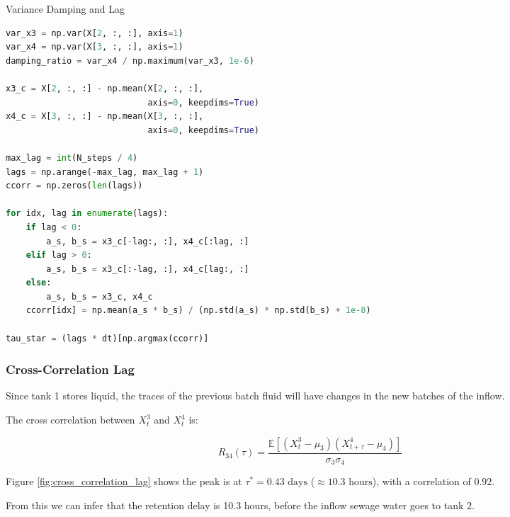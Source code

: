 \documentclass[conference]{IEEEtran}
\renewcommand{\smallskip}{\vspace{0.5\baselineskip}}
\theoremstyle{definitionsc}
\theoremstyle{plainsc}
\theoremstyle{remarksc}
\begin{document}
\begin{algorithm}[htbp]
\caption{Variance Damping and Lag}
\label{alg:variance_damping}
\begin{lstlisting}[language=Python]
var_x3 = np.var(X[2, :, :], axis=1)
var_x4 = np.var(X[3, :, :], axis=1)
damping_ratio = var_x4 / np.maximum(var_x3, 1e-6)

x3_c = X[2, :, :] - np.mean(X[2, :, :], 
                            axis=0, keepdims=True)
x4_c = X[3, :, :] - np.mean(X[3, :, :], 
                            axis=0, keepdims=True)

max_lag = int(N_steps / 4)
lags = np.arange(-max_lag, max_lag + 1)
ccorr = np.zeros(len(lags))

for idx, lag in enumerate(lags):
    if lag < 0:
        a_s, b_s = x3_c[-lag:, :], x4_c[:lag, :]
    elif lag > 0:
        a_s, b_s = x3_c[:-lag, :], x4_c[lag:, :]
    else:
        a_s, b_s = x3_c, x4_c
    ccorr[idx] = np.mean(a_s * b_s) / (np.std(a_s) * np.std(b_s) + 1e-8)

tau_star = (lags * dt)[np.argmax(ccorr)]

\end{lstlisting}
\end{algorithm}






\smallskip

\subsubsection*{\textbf{Cross-Correlation Lag}}

Since tank 1 stores liquid, the traces of the previous batch fluid will have changes in the new batches of the inflow.

\smallskip

The cross correlation between $X_t^3$ and $X_t^4$ is:



\begin{equation*}
	R_{34}(\tau)
=
\frac{
\mathbb{E}[
(X_t^3-\mu_3)(X_{t+\tau}^4-\mu_4)
]
}{
\sigma_3\sigma_4
}
\end{equation*}



Figure \ref{fig:cross_correlation_lag} shows the peak is at $\tau^* = 0.43\text{ days}$ ($\approx 10.3\text{ hours}$), with a correlation of $0.92$.

\smallskip

From this we can infer that the retention delay is 10.3 hours, before the inflow sewage water goes to tank 2.
\end{document}
